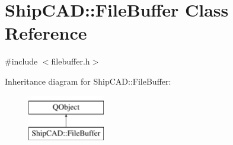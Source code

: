 \hypertarget{classShipCAD_1_1FileBuffer}{\section{Ship\-C\-A\-D\-:\-:File\-Buffer Class Reference}
\label{classShipCAD_1_1FileBuffer}
}


{\ttfamily \#include $<$filebuffer.\-h$>$}

Inheritance diagram for Ship\-C\-A\-D\-:\-:File\-Buffer\-:\begin{figure}[H]
\begin{center}
\leavevmode
\includegraphics[height=2.000000cm]{classShipCAD_1_1FileBuffer}
\end{center}
\end{figure}
